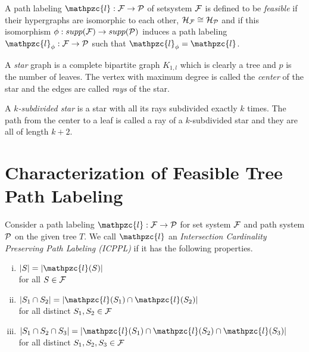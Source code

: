 \documentclass{CRPITStyle} %
\def\cF{{\cal F}}
\def\cH{{\cal H}}
\def\cP{{\cal P}}
\def\cl{\mathpzc{l}}
\def\icppl{\maltese}
\def\xnoindent{} %
\def\topshrink{-2mm}
\begin{document}
\xnoindent
A path labeling $\cl: \cF \rightarrow \cP$ of setsystem $\cF$ is defined to be {\em
  feasible} if their hypergraphs are isomorphic to each other,
$\cH_\cF \cong \cH_\cP$ and if this isomorphism $\phi: supp(\cF)
\rightarrow supp(\cP)$ induces a path labeling $\cl_\phi: \cF
\rightarrow \cP$ such that $\cl_\phi = \cl$. 

\xnoindent A {\em star} graph is a complete bipartite graph $K_{1,l}$
which is clearly a tree and $p$ is the number of leaves. The vertex
with maximum degree is called the {\em center} of the star and the
edges are called {\em rays} of the star.

\xnoindent A {\em $k$-subdivided star} is a star with all its rays
subdivided exactly $k$ times. The path from the center to a leaf is
called a ray of a $k$-subdivided star and they are all of length
$k+2$.


\section{Characterization of Feasible Tree Path  Labeling} 
\label{sec:feasible} 

Consider a path labeling $\cl: \cF \rightarrow \cP$ for set system $\cF$
and path system $\cP$ on the given tree $T$. We
call $\cl$ an {\em Intersection Cardinality Preserving Path Labeling
  (ICPPL)} if it has the following properties.

\vspace{\topshrink}
{\em
  \begin{enumerate}[i.]
  \item $|S| = |\cl(S)|$\\%
    for all $S \in \cF$%
\vspace{\topshrink}
  \item $|S_1 \cap S_2| = |\cl(S_1) \cap
    \cl(S_2)|$\\%
    for all distinct $S_1, S_2 \in
    \cF$%
\vspace{\topshrink}
  \item $|S_1 \cap S_2 \cap S_3| = |\cl(S_1)
    \cap \cl(S_2) \cap
    \cl(S_3)|$\\%
    for all distinct $S_1, S_2, S_3 \in
    \cF$%
  \end{enumerate}}
\end{document}
